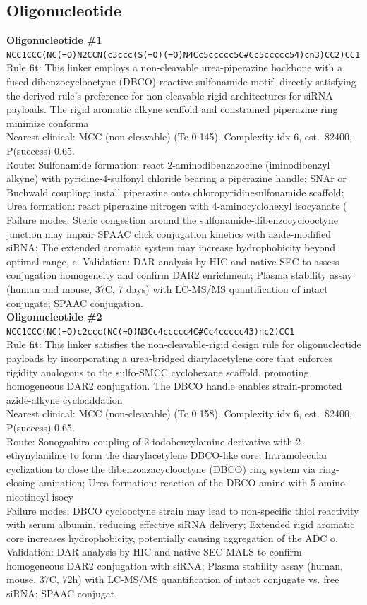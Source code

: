 \documentclass[10pt]{article}
\begin{document}
\subsection{Oligonucleotide}
\noindent\textbf{Oligonucleotide \#1} \\ \texttt{NCC1CCC(NC(=O)N2CCN(c3ccc(S(=O)(=O)N4Cc5ccccc5C\#Cc5ccccc54)cn3)CC2)CC1} \\ Rule fit: This linker employs a non-cleavable urea-piperazine backbone with a fused dibenzocyclooctyne (DBCO)-reactive sulfonamide motif, directly satisfying the derived rule's preference for non-cleavable-rigid architectures for siRNA payloads. The rigid aromatic alkyne scaffold and constrained piperazine ring minimize conforma \\ Nearest clinical: MCC (non-cleavable) (Tc 0.145). Complexity idx 6, est.\ \$2400, P(success) 0.65. \\ Route: Sulfonamide formation: react 2-aminodibenzazocine (iminodibenzyl alkyne) with pyridine-4-sulfonyl chloride bearing a piperazine handle; SNAr or Buchwald coupling: install piperazine onto chloropyridinesulfonamide scaffold; Urea formation: react piperazine nitrogen with 4-aminocyclohexyl isocyanate ( \\ Failure modes: Steric congestion around the sulfonamide-dibenzocyclooctyne junction may impair SPAAC click conjugation kinetics with azide-modified siRNA; The extended aromatic system may increase hydrophobicity beyond optimal range, c. Validation: DAR analysis by HIC and native SEC to assess conjugation homogeneity and confirm DAR2 enrichment; Plasma stability assay (human and mouse, 37\textdegree{}C, 7 days) with LC-MS/MS quantification of intact conjugate; SPAAC conjugation. \\[0.4em]
\noindent\textbf{Oligonucleotide \#2} \\ \texttt{NCC1CCC(NC(=O)c2ccc(NC(=O)N3Cc4ccccc4C\#Cc4ccccc43)nc2)CC1} \\ Rule fit: This linker satisfies the non-cleavable-rigid design rule for oligonucleotide payloads by incorporating a urea-bridged diarylacetylene core that enforces rigidity analogous to the sulfo-SMCC cyclohexane scaffold, promoting homogeneous DAR2 conjugation. The DBCO handle enables strain-promoted azide-alkyne cycloaddation  \\ Nearest clinical: MCC (non-cleavable) (Tc 0.158). Complexity idx 6, est.\ \$2400, P(success) 0.65. \\ Route: Sonogashira coupling of 2-iodobenzylamine derivative with 2-ethynylaniline to form the diarylacetylene DBCO-like core; Intramolecular cyclization to close the dibenzoazacyclooctyne (DBCO) ring system via ring-closing amination; Urea formation: reaction of the DBCO-amine with 5-amino-nicotinoyl isocy \\ Failure modes: DBCO cyclooctyne strain may lead to non-specific thiol reactivity with serum albumin, reducing effective siRNA delivery; Extended rigid aromatic core increases hydrophobicity, potentially causing aggregation of the ADC o. Validation: DAR analysis by HIC and native SEC-MALS to confirm homogeneous DAR2 conjugation with siRNA; Plasma stability assay (human, mouse, 37\textdegree{}C, 72h) with LC-MS/MS quantification of intact conjugate vs. free siRNA; SPAAC conjugat. \\[0.4em]
\end{document}
